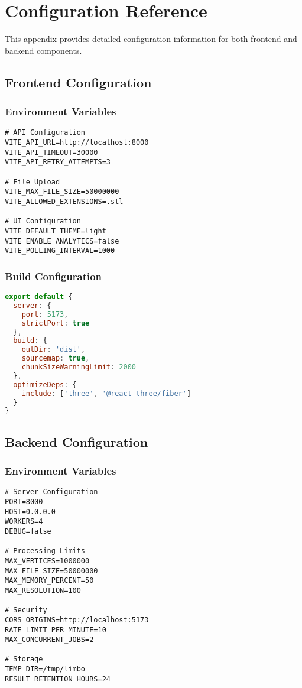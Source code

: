 \chapter{Configuration Reference}
This appendix provides detailed configuration information for both frontend and backend components.

\section{Frontend Configuration}
\subsection{Environment Variables}
\begin{tcolorbox}[title=.env]
\begin{lstlisting}
# API Configuration
VITE_API_URL=http://localhost:8000
VITE_API_TIMEOUT=30000
VITE_API_RETRY_ATTEMPTS=3

# File Upload
VITE_MAX_FILE_SIZE=50000000
VITE_ALLOWED_EXTENSIONS=.stl

# UI Configuration
VITE_DEFAULT_THEME=light
VITE_ENABLE_ANALYTICS=false
VITE_POLLING_INTERVAL=1000
\end{lstlisting}
\end{tcolorbox}

\subsection{Build Configuration}
\begin{tcolorbox}[title=vite.config.js]
\begin{lstlisting}[language=javascript]
export default {
  server: {
    port: 5173,
    strictPort: true
  },
  build: {
    outDir: 'dist',
    sourcemap: true,
    chunkSizeWarningLimit: 2000
  },
  optimizeDeps: {
    include: ['three', '@react-three/fiber']
  }
}
\end{lstlisting}
\end{tcolorbox}

\section{Backend Configuration}
\subsection{Environment Variables}
\begin{tcolorbox}[title=.env]
\begin{lstlisting}
# Server Configuration
PORT=8000
HOST=0.0.0.0
WORKERS=4
DEBUG=false

# Processing Limits
MAX_VERTICES=1000000
MAX_FILE_SIZE=50000000
MAX_MEMORY_PERCENT=50
MAX_RESOLUTION=100

# Security
CORS_ORIGINS=http://localhost:5173
RATE_LIMIT_PER_MINUTE=10
MAX_CONCURRENT_JOBS=2

# Storage
TEMP_DIR=/tmp/limbo
RESULT_RETENTION_HOURS=24
\end{lstlisting}
\end{tcolorbox}

